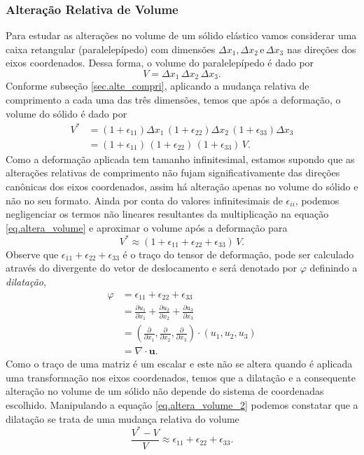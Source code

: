 \subsubsection{Altera\c{c}\~ao Relativa de Volume}

Para estudar as altera\c{c}\~oes no volume de um s\'olido el\'astico vamos considerar uma caixa retangular (paralelep\'ipedo) com dimens\~oes $\Delta x_1, \Delta x_2\,\text{e}\,\Delta x_3$ nas dire\c{c}\~oes dos eixos coordenados.  Dessa forma, o volume do paralelep\'ipedo \'e dado por\begin{equation*}
V=\Delta x_1\,\Delta x_2\,\Delta x_3.
\end{equation*}
Conforme subse\c{c}\~ao \ref{sec.alte_compri}, aplicando a mudan\c{c}a relativa de comprimento a cada uma das tr\^es dimens\~oes, temos que ap\'os a deforma\c{c}\~ao, o volume do s\'olido \'e dado por
\begin{align}\nonumber
V^*&=(1+\epsilon_{11})\Delta x_1\,(1+\epsilon_{22})\Delta x_2\,(1+\epsilon_{33})\Delta x_3\\\label{eq.altera_volume}
&=(1+\epsilon_{11})\,(1+\epsilon_{22})\,(1+\epsilon_{33})\,V.
\end{align}
Como a deforma\c{c}\~ao aplicada tem tamanho infinitesimal, estamos supondo que as altera\c{c}\~oes relativas de comprimento n\~ao fujam significativamente das dire\c{c}\~oes can\^onicas dos eixos coordenados, assim h\'a altera\c{c}\~ao apenas no volume do s\'olido e n\~ao no seu formato. Ainda por conta do valores infinitesimais de $\epsilon_{ii}$, podemos negligenciar os termos n\~ao lineares resultantes da multiplica\c{c}\~ao na equa\c{c}\~ao \ref{eq.altera_volume} e aproximar o volume ap\'os a deforma\c{c}\~ao para
\begin{equation}\label{eq.altera_volume_2}
V^*\approx(1+\epsilon_{11}+\epsilon_{22}+\epsilon_{33})\,V.
\end{equation}
Observe que $\epsilon_{11}+\epsilon_{22}+\epsilon_{33}$ \'e o tra\c{c}o do tensor de deforma\c{c}\~ao, pode ser calculado atrav\'es do divergente do vetor de deslocamento e ser\'a denotado por $\varphi$ definindo a \textit{dilata\c{c}\~ao},
\begin{align*}
\varphi &=\epsilon_{11}+\epsilon_{22}+\epsilon_{33}\\
&=\frac{\partial u_1}{\partial x_1}+\frac{\partial u_2}{\partial x_2}+\frac{\partial u_3}{\partial x_3}\\
&=\left(\frac{\partial}{\partial x_1},\frac{\partial}{\partial x_2},\frac{\partial}{\partial x_3}\right)\cdot(u_1,u_2,u_3)\\
&=\nabla\cdot \mathbf{u}.
\end{align*}
Como o tra\c{c}o de uma matriz \'e um escalar e este n\~ao se altera quando \'e aplicada uma transforma\c{c}\~ao nos eixos coordenados, temos que a dilata\c{c}\~ao e a consequente altera\c{c}\~ao no volume de um s\'olido n\~ao depende do sistema de coordenadas escolhido. Manipulando a equa\c{c}\~ao \ref{eq.altera_volume_2} podemos constatar que a dilata\c{c}\~ao se trata de uma mudan\c{c}a relativa do volume
\begin{equation*}
\frac{V^*-V}{V}\approx\epsilon_{11}+\epsilon_{22}+\epsilon_{33}.
\end{equation*}

